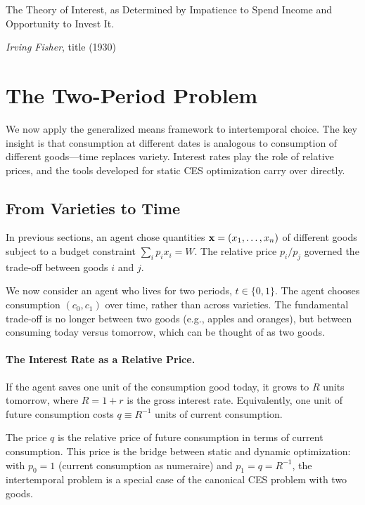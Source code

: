 \epigraph{The Theory of Interest, as Determined by Impatience to Spend Income and Opportunity to Invest It.}{\textit{Irving Fisher}, title (1930)}

\section{The Two-Period Problem}
\label{sec:two-period}

We now apply the generalized means framework to intertemporal choice. The key insight is that consumption at different dates is analogous to consumption of different goods---time replaces variety. Interest rates play the role of relative prices, and the tools developed for static CES optimization carry over directly.

\subsection{From Varieties to Time}
\label{subsec:varieties-to-time}

In previous sections, an agent chose quantities $\mathbf{x} = (x_1, \ldots, x_n)$ of different goods subject to a budget constraint $\sum_i p_i x_i = W$. The relative price $p_i/p_j$ governed the trade-off between goods $i$ and $j$.

We now consider an agent who lives for two periods, $t \in \{0, 1\}$. The agent chooses consumption $(c_0, c_1)$ over time, rather than across varieties. The fundamental trade-off is no longer between two goods (e.g., apples and oranges), but between consuming today versus tomorrow, which can be thought of as two goods.

\paragraph{The Interest Rate as a Relative Price.}
If the agent saves one unit of the consumption good today, it grows to $R$ units tomorrow, where $R = 1 + r$ is the gross interest rate. Equivalently, one unit of future consumption costs $q \equiv R^{-1}$ units of current consumption. 

The price $q$ is the relative price of future consumption in terms of current consumption. This price is the bridge between static and dynamic optimization: with $p_0 = 1$ (current consumption as numeraire) and $p_1 = q = R^{-1}$, the intertemporal problem is a special case of the canonical CES problem with two goods.

